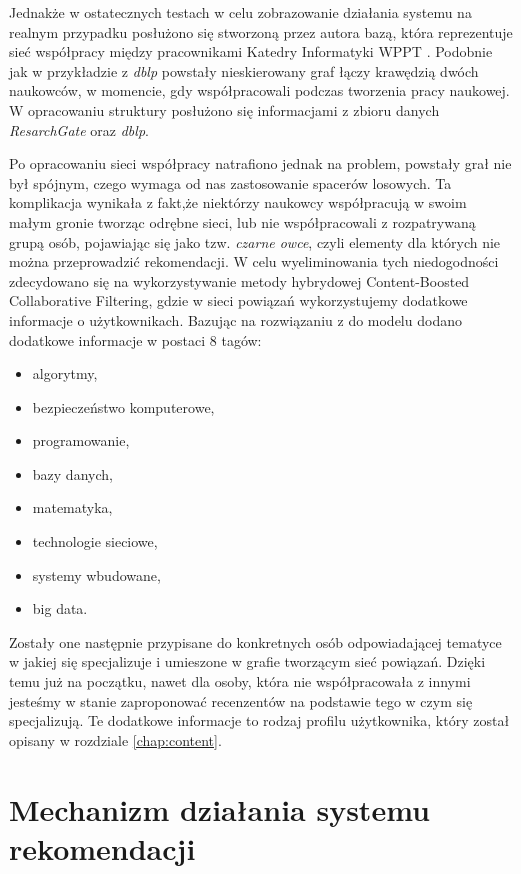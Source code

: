 Jednakże w ostatecznych testach w celu zobrazowanie działania systemu na realnym przypadku posłużono się stworzoną przez autora bazą, która reprezentuje sieć współpracy między pracownikami Katedry Informatyki WPPT \cite{WPPTKatedra}. Podobnie jak w przykładzie z \textit{dblp } powstały nieskierowany graf łączy krawędzią dwóch naukowców, w momencie, gdy współpracowali podczas tworzenia pracy naukowej. W opracowaniu struktury posłużono się informacjami z zbioru danych \textit{ResarchGate} oraz \textit{dblp}. 

Po opracowaniu sieci współpracy natrafiono jednak na problem, powstały grał nie był spójnym, czego wymaga od nas zastosowanie spacerów losowych. Ta komplikacja wynikała z fakt,że niektórzy naukowcy współpracują w swoim małym gronie tworząc odrębne sieci, lub nie współpracowali z rozpatrywaną grupą osób, pojawiając się jako tzw. \textit{czarne owce}, czyli elementy dla których nie można przeprowadzić rekomendacji. W celu wyeliminowania tych niedogodności zdecydowano się na wykorzystywanie metody hybrydowej Content-Boosted Collaborative Filtering, gdzie w sieci powiązań wykorzystujemy dodatkowe informacje o użytkownikach. Bazując na rozwiązaniu z \cite{MovieRecommendationusingRandomWalksovertheContextualGraph} do modelu dodano dodatkowe informacje w postaci 8 tagów:
\begin{itemize}
    \item algorytmy,
    \item bezpieczeństwo komputerowe,
    \item programowanie,
    \item bazy danych,
    \item matematyka,
    \item technologie sieciowe,
    \item systemy wbudowane,
    \item big data.
\end{itemize}
Zostały one następnie przypisane do konkretnych osób odpowiadającej tematyce w jakiej się specjalizuje i umieszone w grafie tworzącym sieć powiązań. Dzięki temu już na początku, nawet dla osoby, która nie współpracowała z innymi jesteśmy w stanie zaproponować recenzentów na podstawie tego w czym się specjalizują. Te dodatkowe informacje to rodzaj profilu użytkownika, który został opisany w rozdziale \ref{chap:content}.

\section{Mechanizm działania systemu rekomendacji}


